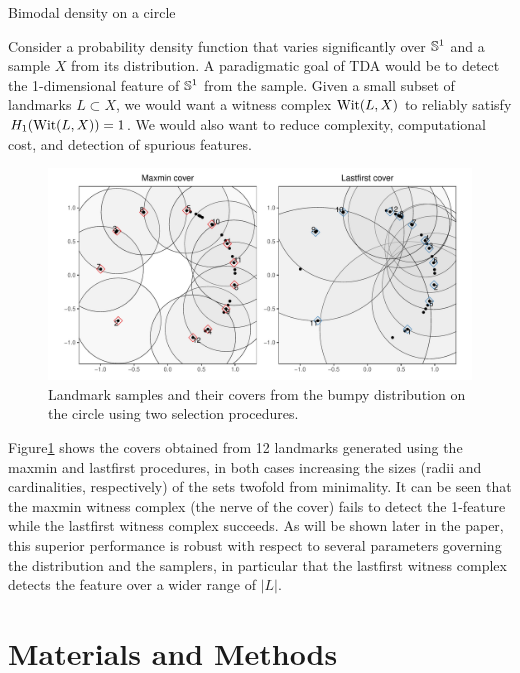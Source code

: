 \documentclass{article}
\begin{document}
\begin{example}{Bimodal density on a circle}
\label{ex:bumpy-circle}

Consider a probability density function that varies significantly over $\mathbb{S}^1$ and a sample $X$ from its distribution.
A paradigmatic goal of TDA would be to detect the 1-dimensional feature of $\mathbb{S}^1$ from the sample.
Given a small subset of landmarks $L \subset X$, we would want a witness complex $\operatorname{Wit}(L,X)$ to reliably satisfy $H_1(\operatorname{Wit}(L,X)) = 1$.
We would also want to reduce complexity, computational cost, and detection of spurious features.

\begin{figure}
\includegraphics[width=\textwidth]{../figures/bumpy-covers}
\caption{
Landmark samples and their covers from the bumpy distribution on the circle using two selection procedures.
\label{fig:bumpy-cover}
}
\end{figure}

Figure\nbs\ref{fig:bumpy-cover} shows the covers obtained from 12 landmarks generated using the maxmin and lastfirst procedures, in both cases increasing the sizes (radii and cardinalities, respectively) of the sets twofold from minimality.
It can be seen that the maxmin witness complex (the nerve of the cover) fails to detect the 1-feature while the lastfirst witness complex succeeds.
As will be shown later in the paper, this superior performance is robust with respect to several parameters governing the distribution and the samplers, in particular that the lastfirst witness complex detects the feature over a wider range of $\lvert L \rvert$.

\end{example}

\hypertarget{materials-and-methods}{%
\section{Materials and Methods}\label{materials-and-methods}}
\end{document}
